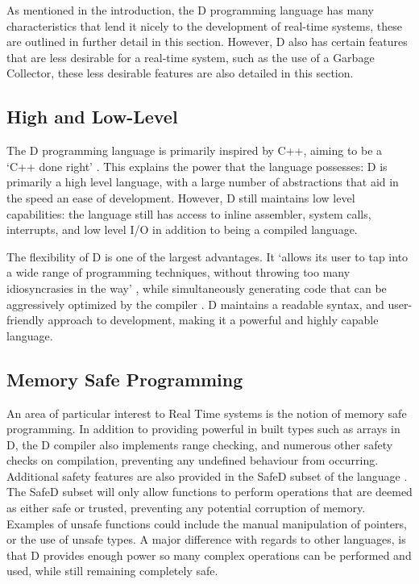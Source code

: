 As mentioned in the introduction, the D programming language has many 
characteristics that lend it nicely to the development of real-time systems, 
these are outlined in further detail in this section. 
However, D also has certain features that are less desirable for a real-time 
system, such as the use of a Garbage Collector, these less desirable features 
are also detailed in this section.


\subsection{High and Low-Level}
The D programming language is primarily inspired by C++, aiming to be a `C++ done
right' 
\cite{qznc.github.io/d-tut/philosophy.html}. This explains the 
power that the language possesses: D is primarily a high level language, with
a large number of abstractions that aid in the speed an ease of development. 
However, D still maintains low level capabilities: the language still has access 
to inline assembler, system calls, interrupts, and low level I/O in addition to 
being a compiled language.
\par\bigskip\noindent
The flexibility of D is one of the largest advantages. It `allows its user to tap 
into a wide range of programming techniques, without throwing too many 
idiosyncrasies in the way'
\cite{ddili.org/ders/d.en/Programming_in_D.pdf}, 
while simultaneously generating code that can be aggressively optimized by the
compiler 
\cite{dlang.org/overview.html}. D maintains a readable syntax, and 
user-friendly approach to development, making it a powerful and highly capable 
language.

\subsection{Memory Safe Programming}
An area of particular interest to Real Time systems is the notion of memory 
safe programming. In addition to providing powerful in built types such as arrays 
in D, the D compiler also implements range checking, and numerous other 
safety checks on compilation, preventing any undefined behaviour from occurring.
Additional safety features are also provided in the SafeD subset of the language
\cite{dlang.org/safed.html}. The SafeD subset will only allow functions to perform 
operations that are deemed as either safe or trusted, preventing any 
potential corruption of memory. Examples of unsafe functions could include the 
manual manipulation of pointers, or the use of unsafe types. A major difference 
with regards to other languages, is that D provides enough power so many complex 
operations can be performed and used, while still remaining completely safe.

